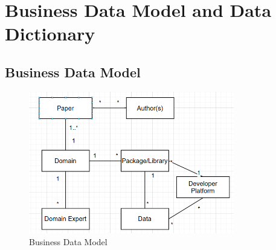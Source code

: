 \documentclass[12pt]{article}
\begin{document}
\section{Business Data Model and Data Dictionary}
\subsection{Business Data Model}
\begin{figure}[h!]
  \centering
  \includegraphics[width=0.8\textwidth]{BusinessDataModel.png}
  \caption{Business Data Model}
  \label{fig:business-data-model}
\end{figure}
\end{document}
